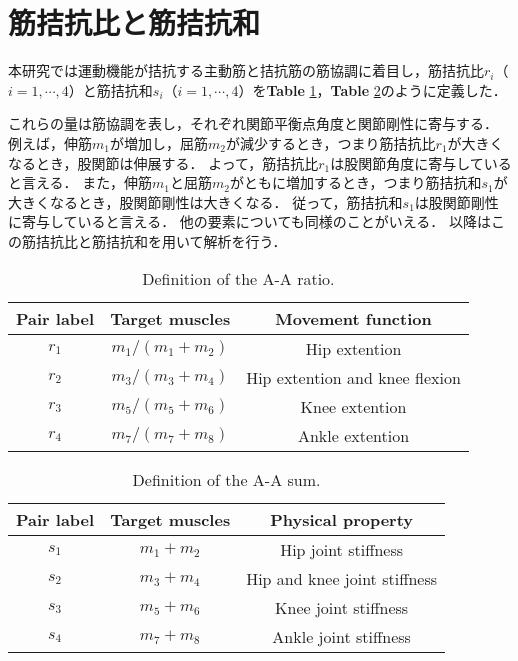 \section{筋拮抗比と筋拮抗和}
本研究では運動機能が拮抗する主動筋と拮抗筋の筋協調に着目し，筋拮抗比$r_i$（$i=1,\cdots,4$）と筋拮抗和$s_i$（$i=1,\cdots,4$）を{\bf Table }\ref{def_ratio}，{\bf Table }\ref{def_sum}のように定義した．
 
これらの量は筋協調を表し，それぞれ関節平衡点角度と関節剛性に寄与する．
例えば，伸筋$m_1$が増加し，屈筋$m_2$が減少するとき，つまり筋拮抗比$r_1$が大きくなるとき，股関節は伸展する．
よって，筋拮抗比$r_1$は股関節角度に寄与していると言える．
また，伸筋$m_1$と屈筋$m_2$がともに増加するとき，つまり筋拮抗和$s_1$が大きくなるとき，股関節剛性は大きくなる．
従って，筋拮抗和$s_1$は股関節剛性に寄与していると言える．
他の要素についても同様のことがいえる．
以降はこの筋拮抗比と筋拮抗和を用いて解析を行う．
\begin{table}[!h]
 \caption{Definition of the A-A ratio.}
 \begin{center}
  \begin{tabular}{|c|c|c|} \hline
   Pair label & Target muscles & Movement function \\ \hline \hline
   $r_1$ & $m_1/(m_1+m_2)$ & Hip extention \\
   $r_2$ & $m_3/(m_3+m_4)$ & Hip extention and knee flexion \\
   $r_3$ & $m_5/(m_5+m_6)$ & Knee extention \\
   $r_4$ & $m_7/(m_7+m_8)$ & Ankle extention \\ \hline
  \end{tabular}
  \label{def_ratio}
 \end{center}
\end{table}

\begin{table}[!h]
 \caption{Definition of the A-A sum.}
 \begin{center}
  \begin{tabular}{|c|c|c|} \hline
   Pair label & Target muscles & Physical property \\ \hline \hline
   $s_1$ & $m_1+m_2$ & Hip joint stiffness \\
   $s_2$ & $m_3+m_4$ & Hip and knee joint stiffness \\
   $s_3$ & $m_5+m_6$ & Knee joint stiffness \\
   $s_4$ & $m_7+m_8$ & Ankle joint stiffness \\ \hline
  \end{tabular}
  \label{def_sum}
 \end{center}
\end{table}


